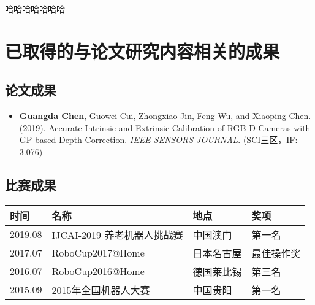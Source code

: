 \documentclass[cs4size,openany,oneside,UTF8,nofonts]{ctexbook}
\begin{document}
\newpage
哈哈哈哈哈哈哈
\newpage

\addtolength{\bibsep}{-0.8em}
\nocite{*}


\newpage
\section{已取得的与论文研究内容相关的成果}
\subsection{论文成果}
\begin{itemize}
  \item \textbf{Guangda Chen}, Guowei Cui, Zhongxiao Jin, Feng Wu, and Xiaoping Chen. (2019). Accurate Intrinsic and Extrinsic Calibration 
  of RGB-D Cameras with GP-based Depth Correction. \textit{IEEE SENSORS JOURNAL}. (SCI三区，IF: 3.076)
\end{itemize}
\subsection{比赛成果}
\begin{table}[!htbp]
  \vspace{-0.5em}\label{table1}\centering{}
  \begin{tabular}{llll}
  \toprule
  时间 & 名称 & 地点 & 奖项\\
  \midrule
  2019.08 & IJCAI-2019 养老机器人挑战赛 & 中国澳门 & 第一名\\
  2017.07 & RoboCup2017@Home & 日本名古屋 & 最佳操作奖\\
  2016.07 & RoboCup2016@Home & 德国莱比锡 & 第三名\\
  2015.09 & 2015年全国机器人大赛 & 中国贵阳 & 第一名\\
  \bottomrule
  \end{tabular}
\end{table}
\end{document}
